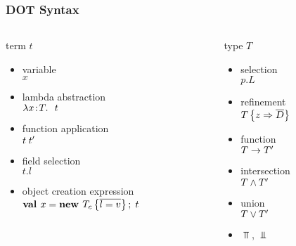 \documentclass{beamer}
\begin{document}
\begin{frame}
\frametitle{DOT Syntax}
\begin{columns}
\begin{column}[t]{5cm}
\begin{block}{term $t$}
\begin{itemize}
\item variable\\$x$
\item lambda abstraction\\$\lambda x\!:\!T.\ \ t$
\item function application\\$t\;t'$
\item field selection\\$t.l$
\item object creation expression\\$\textbf{val }x = \textbf{new }T_c \left\{\overline{l = v}\right\} ;\; t$
\end{itemize}
\end{block}
\end{column}
\begin{column}[t]{5cm}
\begin{block}{type $T$}
\begin{itemize}
\item selection\\$p.L$
\item refinement\\$T \left\{z \Rightarrow \overline{D} \right\}$
\item function\\$T \rightarrow T'$
\item intersection\\$T \wedge T'$
\item union\\$T \vee T'$
\item $\Top$, $\Bot$
\end{itemize}
\end{block}
\end{column}
\end{columns}
\end{frame}
\end{document}
